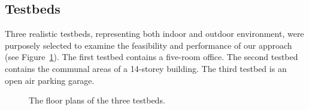 \documentclass[graybox]{svmult}
\begin{document}
\subsection{Testbeds}
\label{sec:testbeds}
Three realistic testbeds, representing both indoor and outdoor environment, were purposely selected to examine the feasibility and performance of our approach (see Figure~\ref{floorplans}). The first testbed contains a five-room office. The second testbed contains the communal areas of a 14-storey building. The third testbed is an open air parking garage.
\begin{figure}[h]
	\centering
	
	\hspace{0.5pt}
	\hfil
	
	\caption{The floor plans of the three testbeds.}
	\label{floorplans}
\end{figure}
\end{document}
